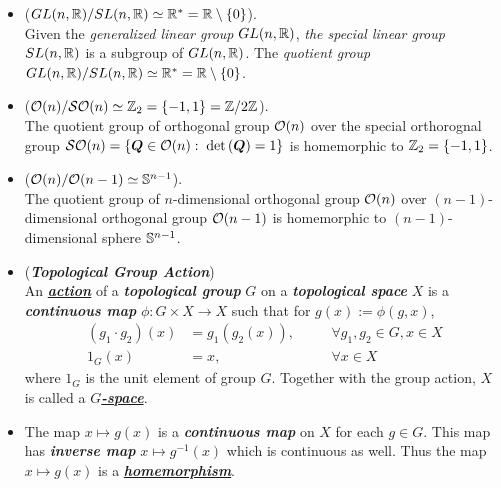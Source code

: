 \documentclass[11pt]{article}
\begin{document}
\begin{itemize}
\item \begin{example} ($GL(n, {\mathbb R})/SL(n, {\mathbb R}) \simeq {\mathbb R}^{*} = {\mathbb R} \setminus \left\{0\right\}$).\\
Given the \emph{generalized linear group} $GL(n, {\mathbb R})$, \emph{the special linear group} $SL(n, {\mathbb R})$ is a subgroup of $GL(n, {\mathbb R})$. The \emph{quotient group} $GL(n, {\mathbb R})/SL(n, {\mathbb R}) \simeq {\mathbb R}^{*} = {\mathbb R} \setminus \left\{0\right\}$.
\end{example}

\item \begin{example}  (${\mathcal O}(n)/{\mathcal S}{\mathcal O}(n) \simeq {\mathbb Z}_{2} =\left\{-1, 1\right\} = {\mathbb Z} / 2{\mathbb Z}$).\\
The quotient group of orthogonal group ${\mathcal O}(n)$ over the special orthorognal group ${\mathcal S}{\mathcal O}(n) = \left\{\boldsymbol{Q}\in {\mathcal O}(n):\;  \det\left(\boldsymbol{Q}\right)= 1\right\}$ is homemorphic to ${\mathbb Z}_{2} = \left\{-1, 1\right\}$.
\end{example}


\item \begin{example}  (${\mathcal O}(n)/{\mathcal O}(n-1) \simeq {\mathbb S}^{n-1}$).\\
The quotient group of $n$-dimensional orthogonal group ${\mathcal O}(n)$ over $(n-1)$-dimensional orthogonal group ${\mathcal O}(n-1)$  is homemorphic to $(n-1)$-dimensional sphere ${\mathbb S}^{n-1}$.
\end{example}

\item \begin{definition} (\emph{\textbf{Topological Group Action}})\\
An \underline{\emph{\textbf{action}}} of a \emph{\textbf{topological group}} $G$ on a \emph{\textbf{topological space}} $X$ is a \emph{\textbf{continuous map}} $\phi: G \times X \rightarrow X$ such that for $g(x):= \phi(g, x)$, 
\begin{align*}
(g_1 \cdot g_2)(x)  &= g_1(g_2(x)), && \quad \forall g_1, g_2 \in G, x\in X\\
1_{G}(x) &= x, &&\quad \forall x\in X
\end{align*} where $1_{G}$ is the unit element of group $G$. Together with the group action, $X$ is called a \underline{\emph{\textbf{$G$-space}}}.
\end{definition}

\item \begin{remark}
The map $x \mapsto g(x)$ is a \emph{\textbf{continuous map}} on $X$ for each $g\in G$. This map has \emph{\textbf{inverse map}} $x \mapsto g^{-1}(x)$ which is continuous as well. Thus the map $x \mapsto g(x)$ is a \underline{\emph{\textbf{homemorphism}}}.
\end{remark}


\end{itemize}
\end{document}
